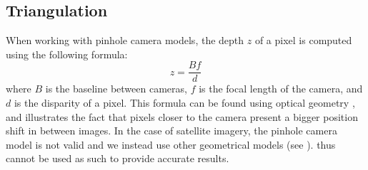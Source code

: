 \subsection{Triangulation}\label{sec:triangulation}
When working with pinhole camera models, the depth $z$ of a pixel is computed using the following formula:
\begin{equation}
	z=\frac{Bf}{d}\label{eq:z_bfd}
\end{equation}
where $B$ is the baseline between cameras, $f$ is the focal length of the camera, and $d$ is the disparity of a pixel. This formula can be found using optical geometry \cite{bolles_epipolar-plane_1987}, and illustrates the fact that pixels closer to the camera present a bigger position shift in between images. In the case of satellite imagery, the pinhole camera model is not valid and we instead use other geometrical models (see ).  thus cannot be used as such to provide accurate results.
